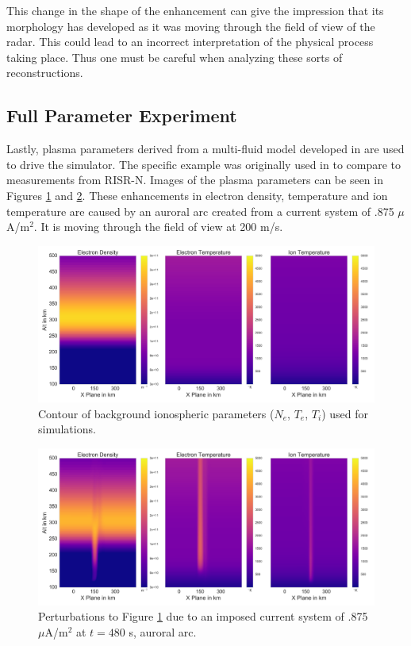 \documentclass[draft,ras]{agutex}
\begin{document}
\begin{article}
This change in the shape of the enhancement can give the impression that its morphology has developed as it was moving through the field of view of the radar. This could lead to an incorrect interpretation of the physical process taking place. Thus one must be careful when analyzing these sorts of reconstructions.

\subsection{Full Parameter Experiment}
Lastly, plasma parameters derived from a multi-fluid model developed in \cite{semeter:plasmatransport2012} are used to drive the simulator. The specific example was originally used in \cite{Perry:2015jf} to compare to measurements from RISR-N. Images of the plasma parameters can be seen in Figures \ref{fig:plparamst0} and \ref{fig:plparamst60}. These enhancements in electron density, temperature and ion temperature are caused by an auroral arc created from a current system of .875 $\mu$A/m$^2$. It is moving through the field of view at 200 m/s.

\begin{figure}[!t]
\centering
\includegraphics[width=5in]{000_inputdata}
\caption{Contour of background ionospheric parameters ($N_e$, $T_e$, $T_i$) used for simulations.}
\label{fig:plparamst0}
\end{figure}

\begin{figure}[!t]
\centering
\includegraphics[width=5in]{0480_input}
\caption{Perturbations to Figure \ref{fig:plparamst0} due to an imposed current system of .875 $\mu$A/m$^2$ at $t=480$ s, auroral arc.}
\label{fig:plparamst60}
\end{figure}


\end{article}
\end{document}
